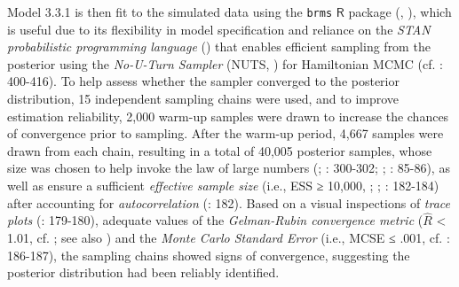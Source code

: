 \documentclass[
  10pt,
  a4paper,
  twoside]{article}
\begin{document}
Model 3.3.1 is then fit to the simulated data using the \texttt{brms} \(\textsf{R}\) package (, ), which is useful due to its flexibility in model specification and reliance on the \emph{STAN probabilistic programming language} () that enables efficient sampling from the posterior using the \emph{No-U-Turn Sampler} (NUTS, ) for Hamiltonian MCMC (cf. : 400-416). To help assess whether the sampler converged to the posterior distribution, 15 independent sampling chains were used, and to improve estimation reliability, 2,000 warm-up samples were drawn to increase the chances of convergence prior to sampling. After the warm-up period, 4,667 samples were drawn from each chain, resulting in a total of 40,005 posterior samples, whose size was chosen to help invoke the law of large numbers (; : 300-302; ; : 85-86), as well as ensure a sufficient \emph{effective sample size} (i.e., ESS ≥ 10,000, ; ; : 182-184) after accounting for \emph{autocorrelation} (: 182). Based on a visual inspections of \emph{trace plots} (: 179-180), adequate values of the \emph{Gelman-Rubin convergence metric} (\(\hat{R}\) \textless{} 1.01, cf. ; see also ) and the \emph{Monte Carlo Standard Error} (i.e., MCSE ≤ .001, cf. : 186-187), the sampling chains showed signs of convergence, suggesting the posterior distribution had been reliably identified.
\end{document}
